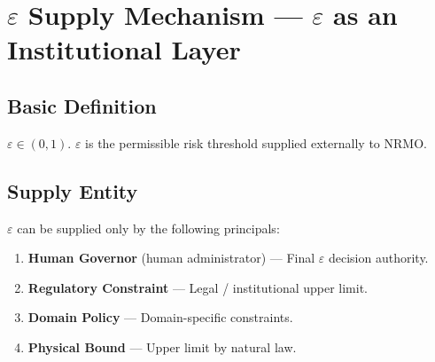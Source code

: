 
\chapter{$\varepsilon$ Supply Mechanism ---
$\varepsilon$ as an Institutional Layer}
\label{ch:epsilon-supply}


\section{Basic Definition}
\label{sec:epsilon-supply-definition}

\begin{definition}
\label{def:epsilon-tolerance}
$\varepsilon \in (0, 1)$. $\varepsilon$ is the permissible risk
threshold supplied externally to NRMO.
\end{definition}

\section{Supply Entity}
\label{sec:epsilon-supply-entity}

$\varepsilon$ can be supplied only by the following principals:

\begin{enumerate}
\item \textbf{Human Governor} (human administrator) --- Final
$\varepsilon$ decision authority.
\item \textbf{Regulatory Constraint} --- Legal / institutional
upper limit.
\item \textbf{Domain Policy} --- Domain-specific constraints.
\item \textbf{Physical Bound} --- Upper limit by natural law.
\end{enumerate}

